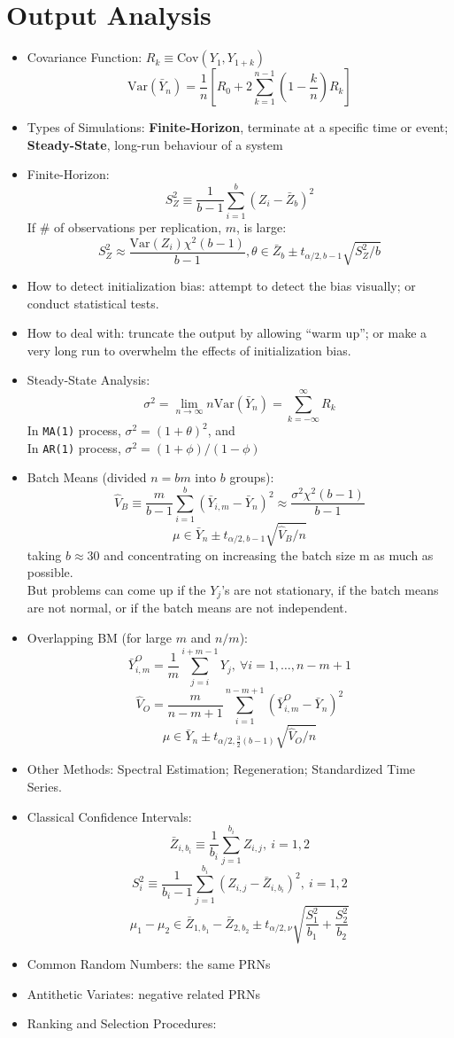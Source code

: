 \documentclass[10pt, twocolumn]{article}
\begin{document}
\section*{Output Analysis}
\begin{itemize}
\item Covariance Function: $R_k \equiv \text{Cov}(Y_1,Y_{1+k})$
\[ \text{Var}(\bar{Y}_n) = \frac{1}{n}\left[R_0+2\sum_{k=1}^{n-1}\left(1-\frac{k}{n}\right)R_k\right] \]
\item Types of Simulations: \textbf{Finite-Horizon}, terminate at a specific time or event; \textbf{Steady-State}, long-run behaviour of a system
\item Finite-Horizon: 
\[ S_Z^2 \equiv \frac{1}{b-1}\sum_{i=1}^b(Z_i-\bar{Z}_b)^2 \]
If \# of observations per replication, $m$, is large:
\[ S_Z^2 \approx \frac{\text{Var}(Z_i)\chi^2(b-1)}{b-1}, \theta\in \bar{Z}_b \pm t_{\alpha/2,b-1}\sqrt{S_Z^2/b} \]
\item How to detect initialization bias: attempt to detect the bias visually; or conduct statistical tests. 
\item How to deal with: truncate the output by allowing ``warm up''; or make a very long run to overwhelm the effects of initialization bias. 
\item Steady-State Analysis: 
\[ \sigma^2 = \lim_{n\to\infty}n\text{Var}(\bar{Y}_n) = \sum_{k=-\infty}^{\infty}R_k \]
In \texttt{MA(1)} process, $\sigma^2=(1+\theta)^2$, and \\
In \texttt{AR(1)} process, $\sigma^2=(1+\phi)/(1-\phi)$
\item Batch Means (divided $n=bm$ into $b$ groups): 
\[ \hat{V}_B \equiv \frac{m}{b-1}\sum_{i=1}^b(\bar{Y}_{i,m}-\bar{Y}_n)^2 \approx \frac{\sigma^2\chi^2(b-1)}{b-1} \]
\[ \mu \in \bar{Y}_n \pm t_{\alpha/2,b-1}\sqrt{\hat{V}_B/n} \]
taking $b \approx 30$ and concentrating on increasing the batch size m as much as possible. \\
But problems can come up if the $Y_j$’s are not stationary, if the batch means are not normal, or if the batch means are not independent.
\item Overlapping BM (for large $m$ and $n/m$): 
\[ \bar{Y}_{i,m}^O = \frac{1}{m}\sum_{j=i}^{i+m-1}Y_j,\ \forall i=1,\dots,n-m+1 \]
\[ \hat{V}_O = \frac{m}{n-m+1}\sum_{i=1}^{n-m+1}(\bar{Y}_{i,m}^O-\bar{Y}_n)^2 \]
\[ \mu \in \bar{Y}_n \pm t_{\alpha/2, \frac{3}{2}(b-1)}\sqrt{\hat{V}_O/n} \]
\item Other Methods: Spectral Estimation; Regeneration; Standardized Time Series. 
\item Classical Confidence Intervals: 
\[ \bar{Z}_{i,b_i} \equiv \frac{1}{b_i}\sum\limits_{j=1}^{b_i}Z_{i,j},\ i=1,2 \]
\[ S_i^2 \equiv \frac{1}{b_i-1}\sum\limits_{j=1}^{b_i}(Z_{i,j}-\bar{Z}_{i,b_i})^2,\ i=1,2 \]
\[ \mu_1-\mu_2 \in \bar{Z}_{1,b_1} - \bar{Z}_{2, b_2} \pm t_{\alpha/2,\nu}\sqrt{\frac{S_1^2}{b_1}+\frac{S_2^2}{b_2}} \]
\item Common Random Numbers: the same PRNs
\item Antithetic Variates: negative related PRNs
\item Ranking and Selection Procedures: 
\end{itemize}
\end{document}
